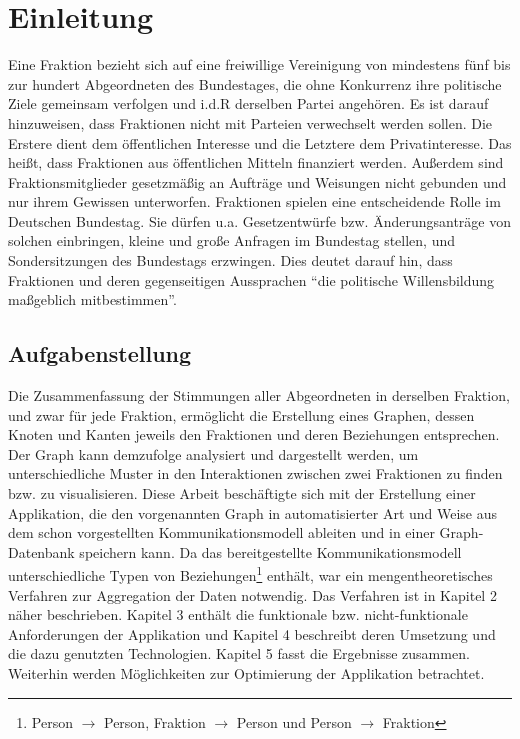 \section{Einleitung}\label{sec:06_01_einleitung}
Eine Fraktion bezieht sich auf eine freiwillige Vereinigung von mindestens fünf bis zur hundert Abgeordneten des Bundestages, die ohne Konkurrenz
ihre politische Ziele gemeinsam verfolgen und i.d.R derselben Partei angehören.
Es ist darauf hinzuweisen, dass Fraktionen nicht mit Parteien verwechselt werden sollen. Die Erstere dient dem öffentlichen Interesse und die Letztere dem Privatinteresse.
Das heißt, dass Fraktionen aus öffentlichen Mitteln finanziert werden.
Außerdem sind Fraktionsmitglieder gesetzmäßig an Aufträge und Weisungen nicht gebunden und nur ihrem Gewissen unterworfen.\newline 
Fraktionen spielen eine entscheidende Rolle im Deutschen Bundestag. 
Sie dürfen u.a. Gesetzentwürfe bzw. Änderungsanträge von solchen einbringen, kleine und große Anfragen im Bundestag stellen, und Sondersitzungen des Bundestags erzwingen. 
Dies deutet darauf hin, dass Fraktionen und deren gegenseitigen Aussprachen ``die politische Willensbildung maßgeblich mitbestimmen''. 
\subsection{Aufgabenstellung}
Die Zusammenfassung der Stimmungen aller Abgeordneten in derselben Fraktion, und zwar für jede Fraktion, ermöglicht
die Erstellung eines Graphen, dessen Knoten und Kanten jeweils den Fraktionen und deren Beziehungen entsprechen. 
Der Graph kann demzufolge analysiert und dargestellt werden, um unterschiedliche Muster in den Interaktionen zwischen zwei Fraktionen zu finden bzw. zu visualisieren.
Diese Arbeit beschäftigte sich mit der Erstellung einer Applikation, die den vorgenannten Graph in automatisierter Art und Weise aus dem schon vorgestellten Kommunikationsmodell ableiten und in einer Graph-Datenbank speichern kann.\newline 
Da das bereitgestellte Kommunikationsmodell unterschiedliche Typen von Beziehungen\footnote{Person $\rightarrow$ Person, Fraktion $\rightarrow$ Person und Person $\rightarrow$ Fraktion} enthält, war ein mengentheoretisches Verfahren zur Aggregation der Daten notwendig. Das Verfahren ist in Kapitel 2 näher beschrieben. 
Kapitel 3 enthält die funktionale bzw. nicht-funktionale Anforderungen der Applikation und Kapitel 4 beschreibt deren Umsetzung und die dazu genutzten Technologien. 
Kapitel 5 fasst die Ergebnisse zusammen. Weiterhin werden Möglichkeiten zur Optimierung der Applikation betrachtet. 
